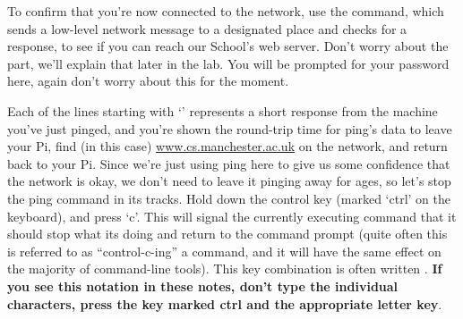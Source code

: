 \begin{comment}
Now that your password isn't the same as the `out of the box' Pi one, it's safe to plug your Pi into the network. You will need to refer to a couple of the illustrations of the Pi that were in Intro lab 0. Locate the blue ethernet cable poking out of the desk (labelled \protect\circled{4} on Figure~\ref{figure:cables}) on page~\pageref{figure:cables}; plug that into the appropriate socket on your Pi (number \circled{8} on Figure~\ref{figure:bare-rpi}, page~\pageref{figure:bare-rpi}). To confirm that you're now connected to the network, use the \cmnd{ping}{ping} command, which sends a low-level network message to a designated place and checks for a response, to see if you can reach our School's web server. Don't worry about the \ttout{sudo} part, we'll explain that later in the lab. You will be prompted for your password here, again don't worry about this for the moment.

\end{comment}

To confirm that you're now connected to the network, use the  command, which sends a low-level network message to a designated place and checks for a response, to see if you can reach our School's web server. Don't worry about the  part, we'll explain that later in the lab. You will be prompted for your password here, again don't worry about this for the moment.



Each of the lines starting with `' represents a short response from the machine you've just pinged, and you're shown the round-trip time for ping's data to leave your Pi, find (in this case) \url{www.cs.manchester.ac.uk} on the network, and return back to your Pi.  Since we're just using ping here to give us some confidence that the network is okay, we don't need to leave it pinging away for ages, so let's stop the ping command in its tracks. Hold down the control key (marked `ctrl' on the keyboard), and press `c'. This will signal the currently executing command that it should stop what its doing and return to the command prompt (quite often this is referred to as ``control-c-ing'' a command, and it will have the same effect on the majority of command-line tools). This key combination is often written . \textbf{If you see this notation in these notes, don't type the individual characters, press the key marked ctrl and the appropriate letter key}.

